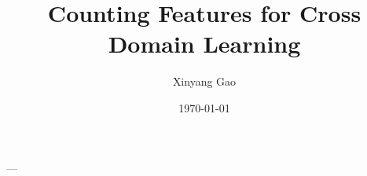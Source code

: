 \documentclass{sig-alternate}
\begin{document}
---

\title{Counting Features for Cross Domain Learning}


%
\author{
%
%
Xinyang Gao
}

\date{\today}
\end{document}
